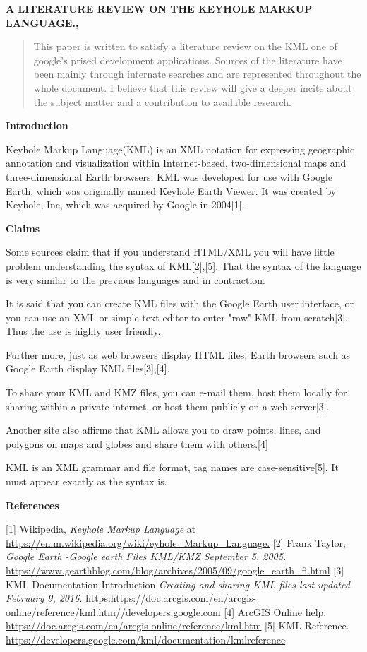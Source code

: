 \documentclass[12pt,a4paper,final]{KML Lit review}
\begin{document}

\noindent \textbf{A LITERATURE REVIEW ON THE KEYHOLE MARKUP LANGUAGE.,}

\begin{abstract}
This paper is written to satisfy a literature review on the KML one of google's prised development applications. Sources of the literature have been mainly through internate searches and are represented throughout the whole document. I believe that this review will give a deeper incite about the subject matter and a contribution to available research.
\end{abstract}

\noindent \textbf{Introduction }
\par
Keyhole Markup Language(KML) is an XML notation for expressing geographic annotation and visualization within Internet-based, two-dimensional maps and three-dimensional Earth browsers. KML was developed for use with Google Earth, which was originally named Keyhole Earth Viewer. It was created by Keyhole, Inc, which was acquired by Google in 2004[1].

\noindent \textbf{Claims}
\par
Some sources claim that if you understand HTML/XML you will have little problem understanding the syntax of KML[2],[5]. That the syntax of the language is very similar to the previous languages and in contraction.
\par
It is said that you can create KML files with the Google Earth user interface, or you can use an XML or simple text editor to enter "raw" KML from scratch[3]. Thus the use is highly user friendly.
\par
Further more, just as web browsers display HTML files, Earth browsers such as Google Earth display KML files[3],[4].
\par
To share your KML and KMZ files, you can e-mail them, host them locally for sharing within a private internet, or host them publicly on a web server[3].
\par
Another site also affirms that KML allows you to draw points, lines, and polygons on maps and globes and share them with others.[4]
\par
KML is an XML grammar and file format, tag names are case-sensitive[5]. It must appear exactly as the syntax is.
\noident
\noident
\noident
\noident
\noident
\noident
\noident
\noident
\noident
\noident
\noident

\noindent \textbf{References}

[1] Wikipedia, \emph{Keyhole Markup Language} at \url{https://en.m.wikipedia.org/wiki/eyhole_Markup_Language.}
[2] Frank Taylor, \emph{Google Earth -Google earth Files KML/KMZ September 5, 2005.} \url{https://www.gearthblog.com/blog/archives/2005/09/google_earth_fi.html}
[3] KML Documentation Introduction \emph{Creating and sharing KML files last updated February 9, 2016.} \url{https:https://doc.arcgis.com/en/arcgis-online/reference/kml.htm//developers.google.com}
[4] ArcGIS Online help. \url{https://doc.arcgis.com/en/arcgis-online/reference/kml.htm}
[5] KML Reference. \url{https://developers.google.com/kml/documentation/kmlreference} 
\end{document}
